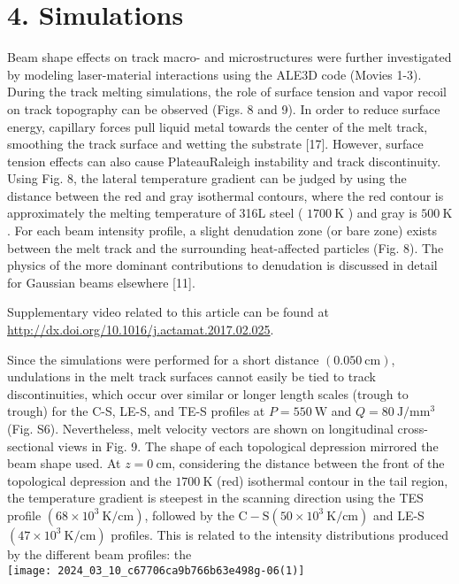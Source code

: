 \documentclass[10pt]{article}
\begin{document}
\section*{4. Simulations}
Beam shape effects on track macro- and microstructures were further investigated by modeling laser-material interactions using the ALE3D code (Movies 1-3). During the track melting simulations, the role of surface tension and vapor recoil on track topography can be observed (Figs. 8 and 9). In order to reduce surface energy, capillary forces pull liquid metal towards the center of the melt track, smoothing the track surface and wetting the substrate [17]. However, surface tension effects can also cause PlateauRaleigh instability and track discontinuity. Using Fig. 8, the lateral temperature gradient can be judged by using the distance between the red and gray isothermal contours, where the red contour is approximately the melting temperature of 316L steel ( $1700 \mathrm{~K}$ ) and gray is $500 \mathrm{~K}$. For each beam intensity profile, a slight denudation zone (or bare zone) exists between the melt track and the surrounding heat-affected particles (Fig. 8). The physics of the more dominant contributions to denudation is discussed in detail for Gaussian beams elsewhere [11].

Supplementary video related to this article can be found at \href{http://dx.doi.org/10.1016/j.actamat.2017.02.025}{http://dx.doi.org/10.1016/j.actamat.2017.02.025}.

Since the simulations were performed for a short distance $(0.050 \mathrm{~cm})$, undulations in the melt track surfaces cannot easily be tied to track discontinuities, which occur over similar or longer length scales (trough to trough) for the C-S, LE-S, and TE-S profiles at $P=550 \mathrm{~W}$ and $Q=80 \mathrm{~J} / \mathrm{mm}^{3}$ (Fig. S6). Nevertheless, melt velocity vectors are shown on longitudinal cross-sectional views in Fig. 9. The shape of each topological depression mirrored the beam shape used. At $z=0 \mathrm{~cm}$, considering the distance between the front of the topological depression and the $1700 \mathrm{~K}$ (red) isothermal contour in the tail region, the temperature gradient is steepest in the scanning direction using the TES profile $\left(68 \times 10^{3} \mathrm{~K} / \mathrm{cm}\right)$, followed by the $\mathrm{C}-\mathrm{S}\left(50 \times 10^{3} \mathrm{~K} / \mathrm{cm}\right)$ and LE-S $\left(47 \times 10^{3} \mathrm{~K} / \mathrm{cm}\right)$ profiles. This is related to the intensity distributions produced by the different beam profiles: the\\
\texttt{[image: 2024\_03\_10\_c67706ca9b766b63e498g-06(1)]}
\end{document}
